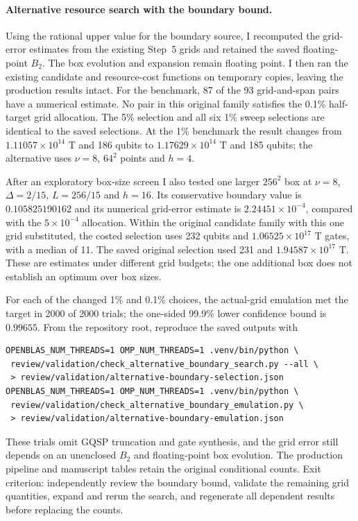 \documentclass[11pt,a4paper]{article}
\begin{document}
\paragraph{Alternative resource search with the boundary bound.}
Using the rational upper value for the boundary source, I recomputed the
grid-error estimates from the existing Step~5 grids and retained the saved
floating-point $B_2$. The box evolution and expansion remain floating point.
I then ran the existing candidate and resource-cost functions on temporary
copies, leaving the production results intact. For the benchmark, 87 of the
93 grid-and-span pairs have a numerical estimate. No pair in this original
family satisfies the 0.1\% half-target grid allocation. The 5\% selection
and all six 1\% sweep selections are identical to the saved selections. At
the 1\% benchmark the result changes from $1.11057\times10^{14}$ T and 186
qubits to $1.17629\times10^{14}$ T and 185 qubits; the alternative uses
$\nu=8$, $64^2$ points and $h=4$.

After an exploratory box-size screen I also tested one larger $256^2$ box
at $\nu=8$, $\Delta=2/15$, $L=256/15$ and $h=16$. Its conservative boundary
value is $0.105825190162$ and its numerical grid-error estimate is
$2.24451\times10^{-4}$, compared with the $5\times10^{-4}$ allocation.
Within the original candidate family with this one grid substituted, the
costed selection uses 232 qubits and $1.06525\times10^{17}$ T gates, with a
median of 11. The saved original selection used 231 and
$1.94587\times10^{17}$ T. These are estimates under different grid budgets;
the one additional box does not establish an optimum over box sizes.

For each of the changed 1\% and 0.1\% choices, the actual-grid emulation met
the target in 2000 of 2000 trials; the one-sided 99.9\% lower confidence
bound is $0.99655$. From the repository root, reproduce the saved outputs with
\begin{verbatim}
OPENBLAS_NUM_THREADS=1 OMP_NUM_THREADS=1 .venv/bin/python \
 review/validation/check_alternative_boundary_search.py --all \
 > review/validation/alternative-boundary-selection.json
OPENBLAS_NUM_THREADS=1 OMP_NUM_THREADS=1 .venv/bin/python \
 review/validation/check_alternative_boundary_emulation.py \
 > review/validation/alternative-boundary-emulation.json
\end{verbatim}
These trials omit GQSP truncation and gate
synthesis, and the grid error still depends on an unenclosed $B_2$ and
floating-point box evolution. The production pipeline and manuscript tables
retain the original conditional counts. Exit criterion: independently review
the boundary bound, validate the remaining grid quantities, expand and rerun
the search, and regenerate all dependent results before replacing the counts.
\end{document}
